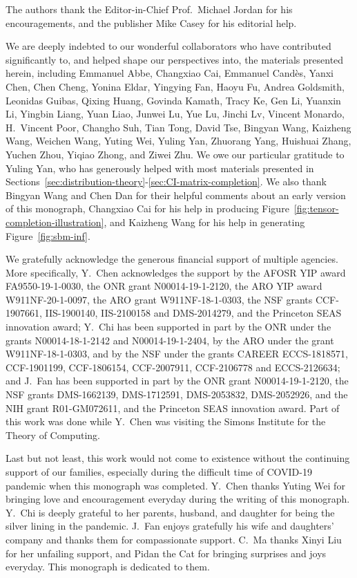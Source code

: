 
\begin{acknowledgements}

The authors thank the Editor-in-Chief Prof.~Michael Jordan for his encouragements, and the publisher Mike Casey for his editorial help.

We are deeply indebted to our wonderful collaborators who have contributed significantly to, and helped shape our perspectives into, the materials presented herein,
including Emmanuel Abbe, Changxiao Cai, Emmanuel Cand\`es, Yanxi Chen, Chen Cheng, Yonina Eldar, Yingying Fan, Haoyu Fu, Andrea Goldsmith, Leonidas Guibas, Qixing Huang, Govinda Kamath, Tracy Ke, Gen Li, Yuanxin Li, Yingbin Liang, Yuan Liao, Junwei Lu, Yue Lu, Jinchi Lv,  Vincent Monardo, H.~Vincent Poor, Changho Suh, Tian Tong, David Tse, Bingyan Wang, Kaizheng Wang, Weichen Wang, Yuting Wei, Yuling Yan, Zhuorang Yang, Huishuai Zhang, Yuchen Zhou, Yiqiao Zhong, and Ziwei Zhu.
We owe our particular gratitude to Yuling Yan, 
who has generously helped with most materials presented in Sections~\ref{sec:distribution-theory}-\ref{sec:CI-matrix-completion}. 
We also thank Bingyan Wang and Chen Dan for their helpful comments about an early version of this monograph, Changxiao Cai for his help in producing Figure~\ref{fig:tensor-completion-illustration}, and Kaizheng Wang for his help in generating Figure~\ref{fig:sbm-inf}. 



We gratefully acknowledge the generous financial support of multiple agencies. More specifically, Y.~Chen acknowledges the support by the AFOSR YIP award FA9550-19-1-0030, the ONR grant N00014-19-1-2120, the ARO YIP award W911NF-20-1-0097, the ARO grant W911NF-18-1-0303,
the NSF grants CCF-1907661, IIS-1900140, IIS-2100158 and DMS-2014279, and the Princeton SEAS innovation award;
Y.~Chi has been supported in part by the ONR under the grants N00014-18-1-2142 and N00014-19-1-2404,
by the ARO under the grant W911NF-18-1-0303, and by the NSF under the grants
CAREER ECCS-1818571, CCF-1901199, CCF-1806154, CCF-2007911, CCF-2106778 and ECCS-2126634;
and J.~Fan has been supported in part by the ONR grant N00014-19-1-2120,
the NSF grants DMS-1662139, DMS-1712591, DMS-2053832,  DMS-2052926, and the NIH grant R01-GM072611, and the Princeton SEAS innovation award.
Part of this work was done while Y.~Chen was visiting the Simons Institute for the Theory of Computing.  


Last but not least, this work would not come to existence without the continuing support of our families, especially during the difficult time of COVID-19 pandemic when this monograph was completed. Y.~Chen thanks Yuting Wei for bringing love and encouragement everyday during the writing of this monograph.  Y.~Chi is deeply grateful to her parents, husband, and daughter for being the silver lining in the pandemic. J.~Fan enjoys gratefully his wife and daughters' company and thanks them for compassionate support.
C.~Ma thanks Xinyi Liu for her unfailing support, and Pidan the Cat for bringing surprises and joys everyday. This monograph is dedicated to them.


\end{acknowledgements}
